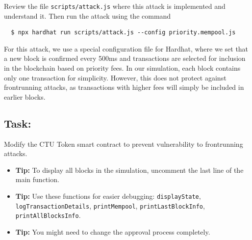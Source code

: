 \documentclass[12pt]{article}
\begin{document}
Review the file \texttt{scripts/attack.js} where this attack is implemented and understand it. Then run the attack using the command

\begin{verbatim}
  $ npx hardhat run scripts/attack.js --config priority.mempool.js
\end{verbatim}

For this attack, we use a special configuration file for Hardhat, where we set that a new block is confirmed every 500ms and transactions are selected for inclusion in the blockchain based on priority fees. In our simulation, each block contains only one transaction for simplicity. However, this does not protect against frontrunning attacks, as transactions with higher fees will simply be included in earlier blocks. 

\subsection*{Task:} Modify the CTU Token smart contract to prevent vulnerability to frontrunning attacks.

\begin{itemize}
  \item \textbf{Tip:} To display all blocks in the simulation, uncomment the last line of the main function.
  \item \textbf{Tip:} Use these functions for easier debugging: \texttt{displayState}, 
  \texttt{logTransactionDetails}, \texttt{printMempool}, \texttt{printLastBlockInfo}, \texttt{printAllBlocksInfo}.
  \item \textbf{Tip:} You might need to change the approval process completely.
\end{itemize}
\end{document}
